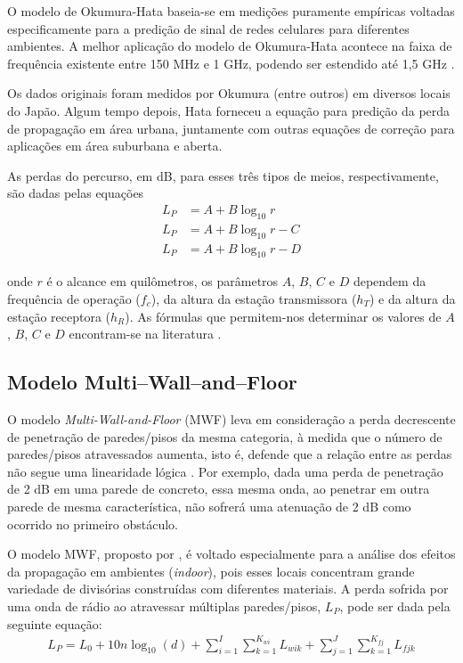 O modelo de Okumura-Hata baseia-se em medições puramente empíricas voltadas especificamente para a predição de sinal de redes celulares para diferentes ambientes. A melhor aplicação do modelo de Okumura-Hata acontece na faixa de frequência existente entre 150 MHz e 1 GHz, podendo ser estendido até 1,5 GHz \cite{haykin2008,rappaport2009}. 

Os dados originais foram medidos por Okumura (entre outros) em diversos locais do Japão. Algum tempo depois, Hata forneceu a equação para predição da perda de propagação em área urbana, juntamente com outras equações de correção para aplicações em área suburbana e aberta.

As perdas do percurso, em dB, para esses três tipos de meios, respectivamente, são dadas pelas equações
\begin{equation}
\begin{split}
	\label{eq:okumura-hata}
		L_P & = A + B\log_{10}r \\
		L_P & = A + B\log_{10}r - C \\
		L_P & = A + B\log_{10}r - D
\end{split}
\end{equation}

\noindent onde $r$ é o alcance em quilômetros, os parâmetros $A$, $B$, $C$ e $D$ dependem da frequência de operação ($f_c$), da altura da estação transmissora ($h_T$) e da altura da estação receptora ($h_R$). As fórmulas que permitem-nos determinar os valores de $A$, $B$, $C$ e $D$ encontram-se na literatura \cite{haykin2008}.

\subsection{Modelo Multi--Wall--and--Floor}
\label{sub:modelo-MWF}

O modelo \emph{Multi-Wall-and-Floor} (MWF) leva em consideração a perda decrescente de penetração de paredes/pisos da mesma categoria, à medida que o número de paredes/pisos atravessados aumenta, isto é, defende que a relação entre as  perdas não segue uma linearidade lógica \cite{lott2001ieee}. Por exemplo, dada uma perda de penetração de 2 dB em uma parede de concreto, essa mesma onda, ao penetrar em outra parede de mesma característica, não sofrerá uma atenuação de 2 dB como ocorrido no primeiro obstáculo.

O modelo MWF, proposto por , é voltado especialmente para a análise dos efeitos da propagação em ambientes (\textit{indoor}), pois esses locais concentram grande variedade de divisórias construídas com diferentes materiais. A perda sofrida por uma onda de rádio ao atravessar múltiplas paredes/pisos, $L_{P}$, pode ser dada pela seguinte equação:
\begin{equation}
	\begin{aligned}
	\label{eq:mwf}
		L_{P} = L_0 + 10n\log_{10}(d) + \sum_{i=1}^{I} \sum_{k=1}^{K_{wi}} L_{wik} + \sum_{j=1}^{J} \sum_{k=1}^{K_{fj}} L_{fjk}
	\end{aligned}
\end{equation}

